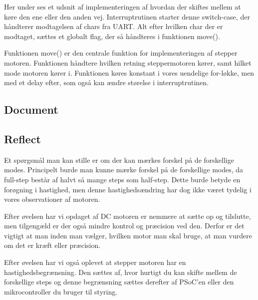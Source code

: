 \documentclass[../main.tex]{subfiles}
\begin{document}
Her under ses et udsnit af implementeringen af hvordan der skiftes mellem at køre den ene eller den anden vej. Interruptrutinen starter denne switch-case, der håndterer modtagelsen af chars fra UART. Alt efter hvilken char der er modtaget, sættes et globalt flag, der så håndteres i funktionen move().



Funktionen move() er den centrale funktion for implementeringen af stepper motoren. Funktionen håndtere hvilken retning steppermotoren kører, samt hilket mode motoren kører i. Funktionen køres konstant i vores uendelige for-løkke, men med et delay efter, som også kan ændre størelse i interruptrutinen.



\subsection{Document}


\subsection{Reflect}
Et spørgsmål man kan stille er om der kan mærkes forskel på de forskellige modes.
Principelt burde man kunne mærke forskel på de forskellige modes, da full-step består af halvt så mange steps som half-step. 
Dette burde betyde en forøgning i hastighed, men denne hastighedsændring har dog ikke været tydelig i vores observationer af motoren.

Efter øvelsen har vi opdaget af DC motoren er nemmere at sætte op og tilslutte, men tilgengæld er der også mindre kontrol og præcision ved den.
Derfor er det vigtigt at man inden man vælger, hvilken motor man skal bruge, at man vurdere om det er kræft eller præcision.

Efter øvelsen har vi også oplevet at stepper motoren har en hastighedsbegrænsning.
Den sættes af, hvor hurtigt du kan skifte mellem de forskellige steps og denne begrænsning sættes derefter af PSoC'en eller den mikrocontroller du bruger til styring.
\end{document}
